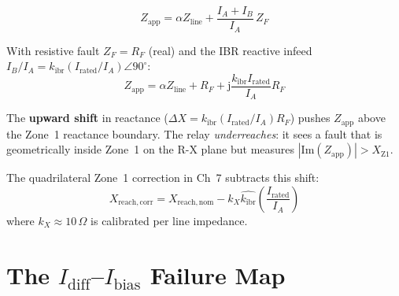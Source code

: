 \documentclass[12pt,a4paper]{article}
\newcommand{\kibr}{k_\mathrm{ibr}}
\newcommand{\Irated}{I_\mathrm{rated}}
\newcommand{\Zapp}{Z_\mathrm{app}}
\newcommand{\Zline}{Z_\mathrm{line}}
\newcommand{\jj}{\mathrm{j}}
\begin{document}
\begin{equation}
  \Zapp = \alpha\Zline + \frac{I_A + I_B}{I_A}\,Z_F
  \label{eq:Zapp}
\end{equation}

With resistive fault $Z_F = R_F$ (real) and the IBR reactive infeed
$I_B/I_A = \kibr(I_\mathrm{rated}/I_A)\angle 90^\circ$:
\begin{equation}
  \Zapp = \alpha\Zline + R_F + \jj\frac{\kibr\Irated}{I_A} R_F
\end{equation}

The \textbf{upward shift} in reactance ($\Delta X = \kibr(\Irated/I_A)R_F$) pushes
$\Zapp$ above the Zone~1 reactance boundary.  The relay \emph{underreaches}: it sees
a fault that is geometrically inside Zone~1 on the R-X plane but measures
$|\text{Im}(\Zapp)| > X_\mathrm{Z1}$.

The quadrilateral Zone~1 correction in Ch~7 subtracts this shift:
\begin{equation}
  X_\mathrm{reach,corr} = X_\mathrm{reach,nom} - k_X \hat{\kibr}
  \left(\frac{\Irated}{I_A}\right)
\end{equation}
where $k_X \approx 10\,\Omega$ is calibrated per line impedance.

\section{The $I_\mathrm{diff}$--$I_\mathrm{bias}$ Failure Map}
\end{document}
